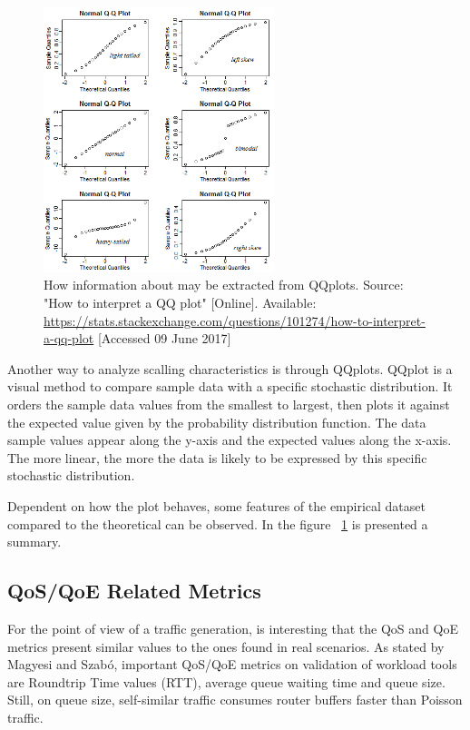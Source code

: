 \begin{figure}[ht!]
	\centering
	\includegraphics[width=0.6\textwidth]{figures/ch2/qqplot-tutorial}
	\caption{ How information about may be extracted from QQplots. Source: "How to interpret a QQ plot" [Online]. Available: \href{https://stats.stackexchange.com/questions/101274/how-to-interpret-a-qq-plot}{https://stats.stackexchange.com/questions/101274/how-to-interpret-a-qq-plot} [Accessed 09 June 2017]}
	\label{fig:qqplot-tutorial}
\end{figure}


Another way to analyze scalling characteristics is through QQplots. QQplot is a visual method to compare sample data with a specific stochastic distribution. It orders the sample data values from the smallest to largest, then plots it against the expected value given by the probability distribution function. The data sample values appear along the y-axis and the expected values along the x-axis. The more linear, the more the data is likely to be expressed by this specific stochastic distribution.

Dependent on how the plot behaves, some features of the empirical dataset compared to the theoretical can be observed. In the figure ~\ref{fig:qqplot-tutorial} is presented a summary. 


\subsection{QoS/QoE Related Metrics}

For the point of view of a traffic generation, is interesting that the QoS and QoE metrics present similar values to the ones found in real scenarios. As stated by Magyesi and Szabó\cite{validate-trafficgen}, important QoS/QoE metrics on validation of workload tools are Roundtrip Time values (RTT), average queue waiting time and queue size. Still, on queue size, self-similar traffic consumes router buffers faster than Poisson traffic\cite{multi-player-online-game-self-similarity}.


